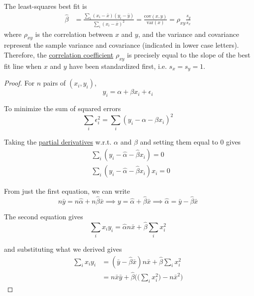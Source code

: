   \begin{theorem}
    \label{thm:best-fit}
    The least-squares best fit is 
    \begin{align}
      \hat{\beta} & = \frac{\sum_i (x_i - \bar{x}) (y_i - \bar{y})}{\sum_i (x_i - \bar{x})^2} = \frac{\mathrm{cov}(x, y)}{\mathrm{var}(x)} = \rho_{xy} \frac{s_y}{s_x}
    \end{align}
    where $\rho_{xy}$ is the correlation between $x$ and $y$, and the variance and covariance represent the sample variance and covariance (indicated in lower case letters). Therefore, the \hyperref[prob-def:correlation-coefficient]{correlation coefficient} $\rho_{xy}$ is precisely equal to the slope of the best fit line when $x$ and $y$ have been standardized first, i.e. $s_x = s_y = 1$. 
  \end{theorem}
  \begin{proof}
    For $n$ pairs of $(x_i, y_i)$, 
    \begin{equation}
      y_i = \alpha + \beta x_i + \epsilon_i
    \end{equation}

    To minimize the sum of squared errors 
    \begin{equation}
      \sum_{i} \epsilon_i^2 = \sum_{i} (y_i - \alpha - \beta x_i)^2
    \end{equation}

    Taking the \hyperref[mv-def:partial-derivative]{partial derivatives} w.r.t. $\alpha$ and $\beta$ and setting them equal to $0$ gives 
    \begin{align}
      &\sum_i (y_i - \hat{\alpha} - \hat{\beta} x_i) = 0 \\
      &\sum_i (y_i - \hat{\alpha} - \hat{\beta} x_i) x_i = 0
    \end{align}

    From just the first equation, we can write 
    \begin{equation}
      n \bar{y} = n \hat{\alpha} + n \hat{\beta} \bar{x} \implies y = \hat{\alpha} + \hat{\beta} \bar{x} \implies \hat{\alpha}  = \bar{y} - \hat{\beta} \bar{x} 
    \end{equation}

    The second equation gives 
    \begin{equation}
      \sum_{i} x_i y_i = \hat{\alpha} n \bar{x} + \hat{\beta} \sum_{i} x_i^2
    \end{equation}

    and substituting what we derived gives 
    \begin{align}
      \sum_{i} x_i y_i & = (\bar{y} - \hat{\beta} \bar{x}) n \bar{x} + \hat{\beta} \sum_i x_i^2 \\
      & = n \bar{x} \bar{y} + \hat{\beta} \bigg( \Big(\sum_i x_i^2 \Big) - n \bar{x}^2 \bigg)
    \end{align}


\end{proof}
